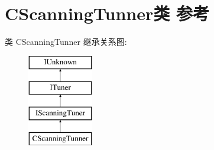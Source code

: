 \hypertarget{class_c_scanning_tunner}{}\section{C\+Scanning\+Tunner类 参考}
\label{class_c_scanning_tunner}
类 C\+Scanning\+Tunner 继承关系图\+:\begin{figure}[H]
\begin{center}
\leavevmode
\includegraphics[height=4.000000cm]{class_c_scanning_tunner}
\end{center}
\end{figure}
